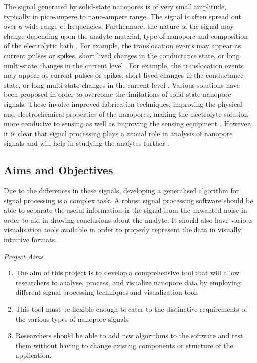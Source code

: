 \documentclass[journal]{IEEEtran}
\begin{document}
The signal generated by solid-state nanopores is of very small amplitude, typically in pico-ampere to nano-ampere range. The signal is often spread out over a wide range of frequencies. Furthermore, the nature of the signal may change depending upon the analyte material, type of nanopore and composition of the electrolytic bath \cite{gokhaleAdvancedSignalProcessing2023}. For example, the translocation events may appear as current pulses or spikes, short lived changes in the conductance state, or long multi-state changes in the current level \cite{forstaterMOSAICModularSingleMolecule2016,varongchayakulSinglemoleculeProteinSensing2018}. For example, the translocation events may appear as current pulses or spikes, short lived changes in the conductance state, or long multi-state changes in the current level \cite{varongchayakulSinglemoleculeProteinSensing2018}. Various solutions have been proposed in order to overcome the limitations of solid state nanopore signals. These involve improved fabrication techniques, improving the physical and electrochemical properties of the nanopores, making the electrolyte solution more conducive to sensing as well as improving the sensing equipment \cite{chauMacromolecularCrowdingEnhances2020,gokhaleAdvancedSignalProcessing2023,milesSingleMoleculeSensing2012}. However, it is clear that signal processing plays a crucial role in analysis of nanopore signals and will help in studying the analytes further \cite{milesSingleMoleculeSensing2012,varongchayakulSinglemoleculeProteinSensing2018}.

\subsection{Aims and Objectives}
Due to the differences in these signals, developing a generalised algorithm for signal processing is a complex task. A robust signal processing software should be able to separate the useful information in the signal from the unwanted noise in order to aid in drawing conclusions about the analyte. It should also have various visualisation tools available in order to properly represent the data in visually intuitive formats.

\noindent \textit{Project Aims}
\begin{enumerate}
\item {The aim of this project is to develop a comprehensive tool that will allow researchers to analyse, process, and visualize nanopore data by employing different signal processing techniques and visualization tools \cite{gokhaleAdvancedSignalProcessing2023}}
\item {This tool must be flexible enough to cater to the distinctive requirements of the various types of nanopore signals.}
\item {Researchers should be able to add new algorithms to the software and test them without having to change existing components or structure of the application.}
\end{enumerate}
\end{document}
